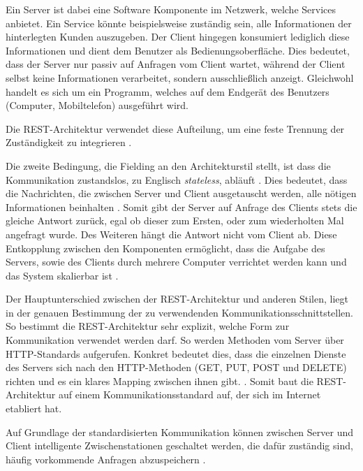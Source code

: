 Ein Server ist dabei eine Software Komponente im Netzwerk, welche Services anbietet. Ein Service könnte beispielsweise zuständig sein, alle Informationen der hinterlegten Kunden auszugeben. Der Client hingegen konsumiert lediglich diese Informationen und dient dem Benutzer als Bedienungsoberfläche. Dies bedeutet, dass der Server nur passiv auf Anfragen vom Client wartet, während der Client selbst keine Informationen verarbeitet, sondern ausschließlich anzeigt. Gleichwohl handelt es sich um ein Programm, welches auf dem Endgerät des Benutzers (Computer, Mobiltelefon) ausgeführt wird.

Die REST-Architektur verwendet diese Aufteilung, um eine feste Trennung der Zuständigkeit zu integrieren \parencite[vgl.][S. 78]{fielding_architectural_2000}.

Die zweite Bedingung, die Fielding an den Architekturstil stellt, ist dass die Kommunikation zustandslos, zu Englisch \textit{stateless}, abläuft \parencite[][S. 78]{fielding_architectural_2000}. Dies bedeutet, dass die Nachrichten, die zwischen Server und Client ausgetauscht werden, alle nötigen Informationen beinhalten \parencite[][S. 128]{starke_effektive_2015}. Somit gibt der Server auf Anfrage des Clients stets die gleiche Antwort zurück, egal ob dieser zum Ersten, oder zum wiederholten Mal angefragt wurde. Des Weiteren hängt die Antwort nicht vom Client ab.
Diese Entkopplung zwischen den Komponenten ermöglicht, dass die Aufgabe des Servers, sowie des Clients durch mehrere Computer verrichtet werden kann und  das System skalierbar ist \parencite[][S. 79]{fielding_architectural_2000}.

Der Hauptunterschied zwischen der REST-Architektur und anderen Stilen, liegt in der genauen Bestimmung der zu verwendenden Kommunikationsschnittstellen. So bestimmt die REST-Architektur sehr explizit, welche Form zur Kommunikation verwendet werden darf. So werden Methoden vom Server über HTTP-Standards aufgerufen. Konkret bedeutet dies, dass die einzelnen Dienste des Servers sich nach den HTTP-Methoden (GET, PUT, POST und DELETE) richten und es ein klares Mapping zwischen ihnen gibt. \parencite[vgl.][S. 128]{starke_effektive_2015}. Somit baut die REST-Architektur auf einem Kommunikationsstandard auf, der sich im Internet etabliert hat.

Auf Grundlage der standardisierten Kommunikation können zwischen Server und Client intelligente Zwischenstationen geschaltet werden, die dafür zuständig sind, häufig vorkommende Anfragen abzuspeichern \parencites[vgl.][S. 79 f.]{fielding_architectural_2000}[][S. 128]{starke_effektive_2015}.

